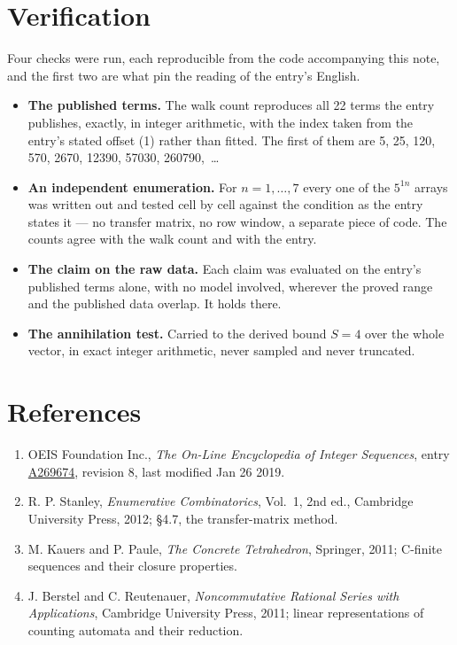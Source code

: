 \documentclass[11pt]{article}
\theoremstyle{definition}
\begin{document}
\section{Verification}

Four checks were run, each reproducible from the code accompanying this note, and the first two are what pin the reading of the entry's English.

\begin{itemize}

\item {\bfseries The published terms.} The walk count reproduces all 22 terms the entry publishes, exactly, in integer arithmetic, with the index taken from the entry's stated offset (1) rather than fitted. The first of them are 5, 25, 120, 570, 2670, 12390, 57030, 260790,~\dots

\item {\bfseries An independent enumeration.} For $n = 1,\dots,7$ every one of the $5^{1n}$ arrays was written out and tested cell by cell against the condition as the entry states it --- no transfer matrix, no row window, a separate piece of code. The counts agree with the walk count and with the entry.

\item {\bfseries The claim on the raw data.} Each claim was evaluated on the entry's published terms alone, with no model involved, wherever the proved range and the published data overlap. It holds there.

\item {\bfseries The annihilation test.} Carried to the derived bound $S = 4$ over the whole vector, in exact integer arithmetic, never sampled and never truncated.

\end{itemize}

\section{References}

\begin{enumerate}

\item OEIS Foundation Inc., \emph{The On-Line Encyclopedia of Integer Sequences}, entry \href{https://oeis.org/A269674}{A269674}, revision 8, last modified Jan 26 2019.

\item R. P. Stanley, \emph{Enumerative Combinatorics}, Vol.~1, 2nd ed., Cambridge University Press, 2012; \S4.7, the transfer-matrix method.

\item M. Kauers and P. Paule, \emph{The Concrete Tetrahedron}, Springer, 2011; C-finite sequences and their closure properties.

\item J. Berstel and C. Reutenauer, \emph{Noncommutative Rational Series with Applications}, Cambridge University Press, 2011; linear representations of counting automata and their reduction.

\end{enumerate}
\end{document}
